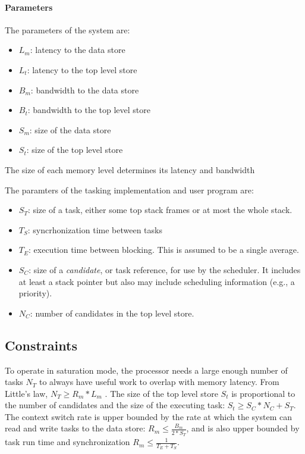\paragraph{Parameters}
The parameters of the system are: 
\begin{itemize}
    \item $L_m$: latency to the data store
    \item $L_t$: latency to the top level store
    \item $B_m$: bandwidth to the data store
    \item $B_t$: bandwidth to the top level store
    \item $S_m$: size of the data store
    \item $S_t$: size of the top level store
\end{itemize}

The size of each memory level determines its latency and bandwidth

The paramters of the tasking implementation and
user program are:
\begin{itemize}
    \item $S_T$: size of a task, either some top stack frames or at most the whole stack.
    \item $T_S$: syncrhonization time between tasks
    \item $T_E$: execution time between blocking. This is assumed to
        be a single average.
    \item $S_C$: size of a \emph{candidate}, or task reference, for use by the scheduler. It
        includes at least a stack pointer but also may include
        scheduling information (e.g., a priority).
    \item $N_C$: number of candidates in the top level store.
\end{itemize}

\subsection{Constraints}
To operate in saturation mode, the processor needs a large enough
number of tasks $N_T$ to
always have useful work to overlap with memory latency. From Little's
law, $N_T \ge R_m * L_m$ . The size of the top
level store $S_t$ is proportional to the number of candidates and the
size of the executing task: $S_t \ge S_C * N_C + S_T$. The context
switch rate is upper bounded by the rate at which the system can read
and write tasks to the data store: $R_m \le \frac{B_m}{2*S_T}$, and is
also upper bounded by task run time and synchronization $R_m \le
\frac{1}{T_E + T_S}$.



